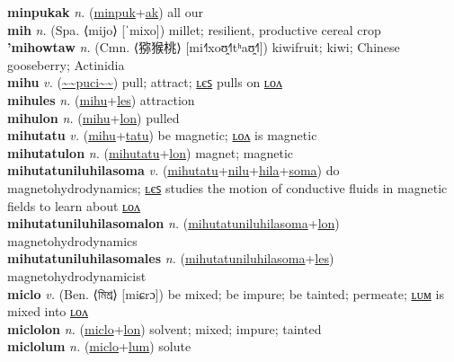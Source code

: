 \textbf{minpukak} \textit{n.} (\hyperref[minpuk]{minpuk}+\hyperref[ak]{ak})
all our \label{minpukak} \\
\textbf{mih} \textit{n.} (Spa. ⟨mijo⟩ [ˈmixo])
millet; resilient, productive cereal crop \label{mih} \\
\textbf{'mihowtaw} \textit{n.} (Cmn. ⟨猕猴桃⟩ [mi˧˥xoʊ̯˧˥tʰaʊ̯˧˥])
kiwifruit; kiwi; Chinese gooseberry; Actinidia \label{'mihowtaw} \\
\textbf{mihu} \textit{v.} (\hyperref[puci]{\~{}\~{}puci\~{}\~{}})
pull; attract; \hyperref[mihules]{ʟєꜱ} pulls on \hyperref[mihulon]{ʟᴏᴧ} \label{mihu} \\
\textbf{mihules} \textit{n.} (\hyperref[mihu]{mihu}+\hyperref[les]{les})
attraction \label{mihules} \\
\textbf{mihulon} \textit{n.} (\hyperref[mihu]{mihu}+\hyperref[lon]{lon})
pulled \label{mihulon} \\
\textbf{mihutatu} \textit{v.} (\hyperref[mihu]{mihu}+\hyperref[tatu]{tatu})
be magnetic; \hyperref[mihutatulon]{ʟᴏᴧ} is magnetic \label{mihutatu} \\
\textbf{mihutatulon} \textit{n.} (\hyperref[mihutatu]{mihutatu}+\hyperref[lon]{lon})
magnet; magnetic \label{mihutatulon} \\
\textbf{mihutatuniluhilasoma} \textit{v.} (\hyperref[mihutatu]{mihutatu}+\hyperref[nilu]{nilu}+\hyperref[hila]{hila}+\hyperref[soma]{soma})
do magnetohydrodynamics; \hyperref[mihutatuniluhilasomales]{ʟєꜱ} studies the motion of conductive fluids in magnetic fields to learn about \hyperref[mihutatuniluhilasomalon]{ʟᴏᴧ} \label{mihutatuniluhilasoma} \\
\textbf{mihutatuniluhilasomalon} \textit{n.} (\hyperref[mihutatuniluhilasoma]{mihutatuniluhilasoma}+\hyperref[lon]{lon})
magnetohydrodynamics \label{mihutatuniluhilasomalon} \\
\textbf{mihutatuniluhilasomales} \textit{n.} (\hyperref[mihutatuniluhilasoma]{mihutatuniluhilasoma}+\hyperref[les]{les})
magnetohydrodynamicist \label{mihutatuniluhilasomales} \\
\textbf{miclo} \textit{v.} (Ben. ⟨মিশ্র⟩ [miɕrɔ])
be mixed; be impure; be tainted; permeate; \hyperref[miclolum]{ʟᴜᴍ} is mixed into \hyperref[miclolon]{ʟᴏᴧ} \label{miclo} \\
\textbf{miclolon} \textit{n.} (\hyperref[miclo]{miclo}+\hyperref[lon]{lon})
solvent; mixed; impure; tainted \label{miclolon} \\
\textbf{miclolum} \textit{n.} (\hyperref[miclo]{miclo}+\hyperref[lum]{lum})
solute \label{miclolum} \\
